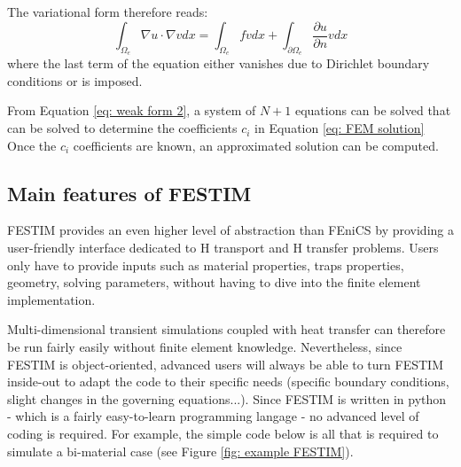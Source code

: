 The variational form therefore reads:
\begin{equation}
    \int_{\Omega_e} \nabla u \cdot \nabla v dx = \int_{\Omega_e} f v dx + \int_{\partial \Omega_e} \frac{\partial u}{\partial n} v dx
    \label{eq: weak form 2}
\end{equation}
where the last term of the equation either vanishes due to Dirichlet boundary conditions or is imposed.

From Equation \ref{eq: weak form 2}, a system of $N+1$ equations can be solved that can be solved to determine the coefficients $c_i$ in Equation \ref{eq: FEM solution}
Once the $c_i$ coefficients are known, an approximated solution can be computed.

\subsection{Main features of FESTIM}
FESTIM provides an even higher level of abstraction than FEniCS by providing a user-friendly interface dedicated to H transport and H transfer problems.
Users only have to provide inputs such as material properties, traps properties, geometry, solving parameters, without having to dive into the finite element implementation.

Multi-dimensional transient simulations coupled with heat transfer can therefore be run fairly easily without finite element knowledge.
Nevertheless, since FESTIM is object-oriented, advanced users will always be able to turn FESTIM inside-out to adapt the code to their specific needs (specific boundary conditions, slight changes in the governing equations...).
Since FESTIM is written in python - which is a fairly easy-to-learn programming langage - no advanced level of coding is required.
For example, the simple code below is all that is required to simulate a bi-material case (see Figure \ref{fig: example FESTIM}).


